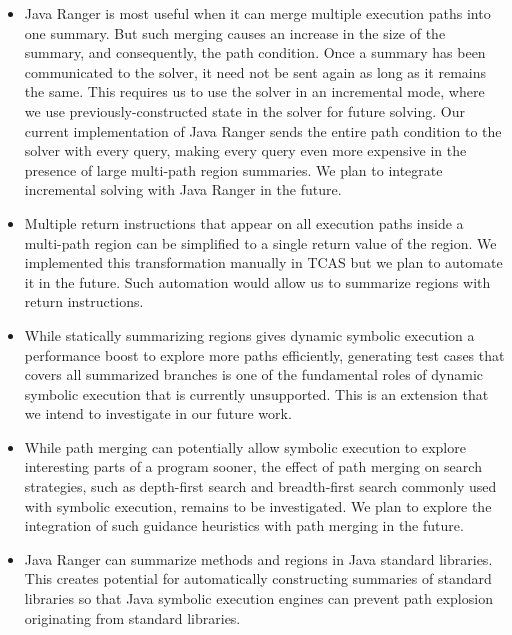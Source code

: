 \begin{itemize}
\item Java Ranger is most useful when it can merge multiple execution paths into one summary. But such merging causes an
increase in the size of the summary, and consequently, the path condition.
%
Once a summary has been communicated to the solver, it need not be sent again as long as it remains the same.
%
This requires us to use the solver in an incremental mode, where we use previously-constructed state in the solver for
future solving.
%
Our current implementation of Java Ranger sends the entire path condition to the solver with every query, making every
query even more expensive in the presence of large multi-path region summaries.
%
We plan to integrate incremental solving with Java Ranger in the future.
%
\item Multiple return instructions that appear on all execution paths inside a multi-path region can be simplified to a
single return value of the region.
%
We implemented this transformation manually in TCAS but we plan to automate it in the future.
%
Such automation would allow us to summarize regions with return instructions.
%
\item While statically summarizing regions gives dynamic symbolic execution a
performance boost to explore more paths efficiently, generating test cases that covers all summarized branches is one of
the fundamental roles of dynamic symbolic execution that is currently unsupported.
%
This is an extension that we intend to investigate in our future work.
%
\item While path merging can potentially allow symbolic execution to explore interesting parts of a program sooner, the
effect of path merging on search strategies, such as depth-first search and breadth-first search commonly used with
symbolic execution, remains to be investigated. We plan to explore the integration of such guidance heuristics with path merging in the future.
%
\item Java Ranger can summarize methods and regions in Java standard libraries. This creates potential for automatically
constructing summaries of standard libraries so that Java symbolic execution engines can prevent path explosion
originating from standard libraries.
%
\end{itemize}